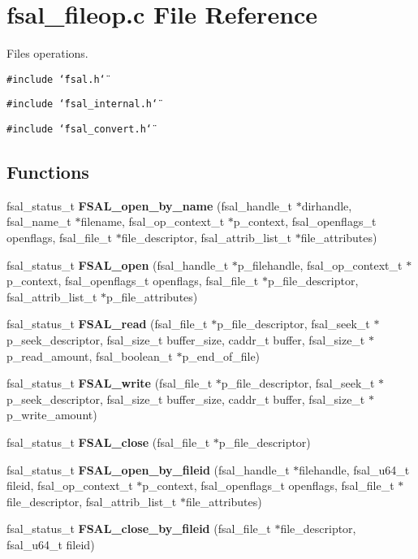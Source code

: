 \section{fsal\_\-fileop.c File Reference}
\label{fsal__fileop_8c}
Files operations. 

{\tt \#include \char`\"{}fsal.h\char`\"{}}\par
{\tt \#include \char`\"{}fsal\_\-internal.h\char`\"{}}\par
{\tt \#include \char`\"{}fsal\_\-convert.h\char`\"{}}\par
\subsection*{Functions}
\begin{CompactItemize}
\item 
fsal\_\-status\_\-t {\bf FSAL\_\-open\_\-by\_\-name} (fsal\_\-handle\_\-t $\ast$dirhandle, fsal\_\-name\_\-t $\ast$filename, fsal\_\-op\_\-context\_\-t $\ast$p\_\-context, fsal\_\-openflags\_\-t openflags, fsal\_\-file\_\-t $\ast$file\_\-descriptor, fsal\_\-attrib\_\-list\_\-t $\ast$file\_\-attributes)
\item 
fsal\_\-status\_\-t {\bf FSAL\_\-open} (fsal\_\-handle\_\-t $\ast$p\_\-filehandle, fsal\_\-op\_\-context\_\-t $\ast$p\_\-context, fsal\_\-openflags\_\-t openflags, fsal\_\-file\_\-t $\ast$p\_\-file\_\-descriptor, fsal\_\-attrib\_\-list\_\-t $\ast$p\_\-file\_\-attributes)
\item 
fsal\_\-status\_\-t {\bf FSAL\_\-read} (fsal\_\-file\_\-t $\ast$p\_\-file\_\-descriptor, fsal\_\-seek\_\-t $\ast$p\_\-seek\_\-descriptor, fsal\_\-size\_\-t buffer\_\-size, caddr\_\-t buffer, fsal\_\-size\_\-t $\ast$p\_\-read\_\-amount, fsal\_\-boolean\_\-t $\ast$p\_\-end\_\-of\_\-file)
\item 
fsal\_\-status\_\-t {\bf FSAL\_\-write} (fsal\_\-file\_\-t $\ast$p\_\-file\_\-descriptor, fsal\_\-seek\_\-t $\ast$p\_\-seek\_\-descriptor, fsal\_\-size\_\-t buffer\_\-size, caddr\_\-t buffer, fsal\_\-size\_\-t $\ast$p\_\-write\_\-amount)
\item 
fsal\_\-status\_\-t {\bf FSAL\_\-close} (fsal\_\-file\_\-t $\ast$p\_\-file\_\-descriptor)
\item 
fsal\_\-status\_\-t {\bf FSAL\_\-open\_\-by\_\-fileid} (fsal\_\-handle\_\-t $\ast$filehandle, fsal\_\-u64\_\-t fileid, fsal\_\-op\_\-context\_\-t $\ast$p\_\-context, fsal\_\-openflags\_\-t openflags, fsal\_\-file\_\-t $\ast$file\_\-descriptor, fsal\_\-attrib\_\-list\_\-t $\ast$file\_\-attributes)\label{fsal__fileop_8c_a5}

\item 
fsal\_\-status\_\-t {\bf FSAL\_\-close\_\-by\_\-fileid} (fsal\_\-file\_\-t $\ast$file\_\-descriptor, fsal\_\-u64\_\-t fileid)\label{fsal__fileop_8c_a6}

\end{CompactItemize}



